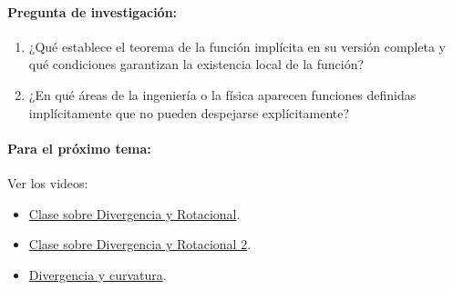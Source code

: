 \documentclass[a4,11pt]{aleph-notas}
\begin{document}
\paragraph{Pregunta de investigación:}
\begin{enumerate}[leftmargin=*]
    \item ¿Qué establece el teorema de la función implícita en su versión completa y qué condiciones garantizan la existencia local de la función?
    \item ¿En qué áreas de la ingeniería o la física aparecen funciones definidas implícitamente que no pueden despejarse explícitamente?
\end{enumerate}

\paragraph{Para el próximo tema:}
Ver los videos:
\begin{itemize}[leftmargin=*]
    \item \href{https://youtu.be/GRXgv9GCOCo?si=PEnJrz5_Sjy36cPX}{Clase sobre Divergencia y Rotacional}.
    \item \href{https://youtu.be/cMtxUdzhBLg?si=FTWGbNGlKSHpQS6W}{Clase sobre Divergencia y Rotacional 2}.
    \item \href{https://youtu.be/rB83DpBJQsE?si=xTd73OwzR8vpNF-k}{Divergencia y curvatura}.
\end{itemize}
\end{document}
